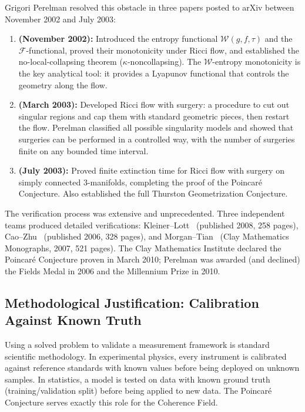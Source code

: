 \documentclass[11pt]{article}
\begin{document}
Grigori Perelman resolved this obstacle in three papers posted to
arXiv between November 2002 and July 2003:

\begin{enumerate}
\item \textbf{\cite{Per1} (November 2002):} Introduced the entropy
functional $\mathcal{W}(g,f,\tau)$ and the $\mathcal{F}$-functional,
proved their monotonicity under Ricci flow, and established the
no-local-collapsing theorem ($\kappa$-noncollapsing).  The
$\mathcal{W}$-entropy monotonicity is the key analytical tool: it
provides a Lyapunov functional that controls the geometry along the flow.

\item \textbf{\cite{Per2} (March 2003):}  Developed Ricci flow with
surgery: a procedure to cut out singular regions and cap them with
standard geometric pieces, then restart the flow.  Perelman classified
all possible singularity models and showed that surgeries can be
performed in a controlled way, with the number of surgeries finite on
any bounded time interval.

\item \textbf{\cite{Per3} (July 2003):}  Proved finite extinction time
for Ricci flow with surgery on simply connected 3-manifolds, completing
the proof of the Poincar\'e Conjecture.  Also established the full
Thurston Geometrization Conjecture.
\end{enumerate}

\noindent
The verification process was extensive and unprecedented.  Three
independent teams produced detailed verifications:
Kleiner--Lott~\cite{KL} (published 2008, 258 pages),
Cao--Zhu~\cite{CaoZhu} (published 2006, 328 pages), and
Morgan--Tian~\cite{MorganTian} (Clay Mathematics Monographs, 2007,
521 pages).  The Clay Mathematics Institute declared the Poincar\'e
Conjecture proven in March 2010; Perelman was awarded (and declined)
the Fields Medal in 2006 and the Millennium Prize in 2010.

\subsection{Methodological Justification: Calibration Against Known Truth}
\label{subsec:calibration}

Using a solved problem to validate a measurement framework is standard
scientific methodology.  In experimental physics, every instrument is
calibrated against reference standards with known values before being
deployed on unknown samples.  In statistics, a model is tested on data
with known ground truth (training/validation split) before being applied
to new data.  The Poincar\'e Conjecture serves exactly this role for the
Coherence Field.
\end{document}
